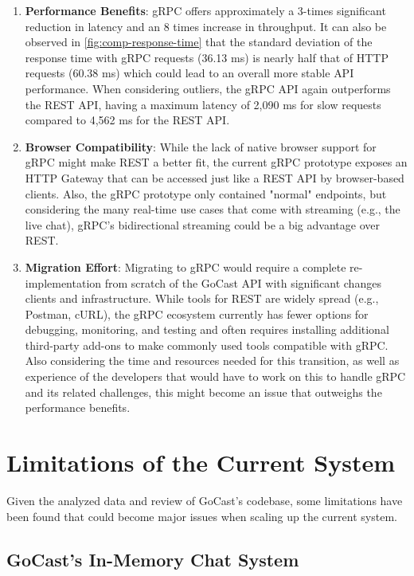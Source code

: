 \begin{enumerate}
    \item \textbf{Performance Benefits}: gRPC offers approximately a 3-times significant reduction in latency and an 8 times increase in throughput. It can also be observed in \autoref{fig:comp-response-time} that the standard deviation of the response time with gRPC requests (36.13 ms) is nearly half that of HTTP requests (60.38 ms) which could lead to an overall more stable \ac{API} performance.  When considering outliers, the gRPC \ac{API} again outperforms the REST \ac{API}, having a maximum latency of 2,090 ms for slow requests compared to 4,562 ms for the REST \ac{API}.

    \item \textbf{Browser Compatibility}: While the lack of native browser support for gRPC might make REST a better fit, the current gRPC prototype exposes an HTTP Gateway that can be accessed just like a REST API by browser-based clients. Also, the gRPC prototype only contained "normal" endpoints, but considering the many real-time use cases that come with streaming (e.g., the live chat), gRPC’s bidirectional streaming could be a big advantage over REST.

    \item \textbf{Migration Effort}: Migrating to gRPC would require a complete re-implementation from scratch of the GoCast \ac{API} with significant changes clients and infrastructure. While tools for REST are widely spread (e.g., Postman, cURL), the gRPC ecosystem currently has fewer options for debugging, monitoring, and testing and often requires installing additional third-party add-ons to make commonly used tools compatible with gRPC. Also considering the time and resources needed for this transition, as well as experience of the developers that would have to work on this to handle gRPC and its related challenges, this might become an issue that outweighs the performance benefits.
\end{enumerate}

\section{Limitations of the Current System}

Given the analyzed data and review of GoCast's codebase, some limitations have been found that could become major issues when scaling up the current system.

\subsection{GoCast's In-Memory Chat System}

